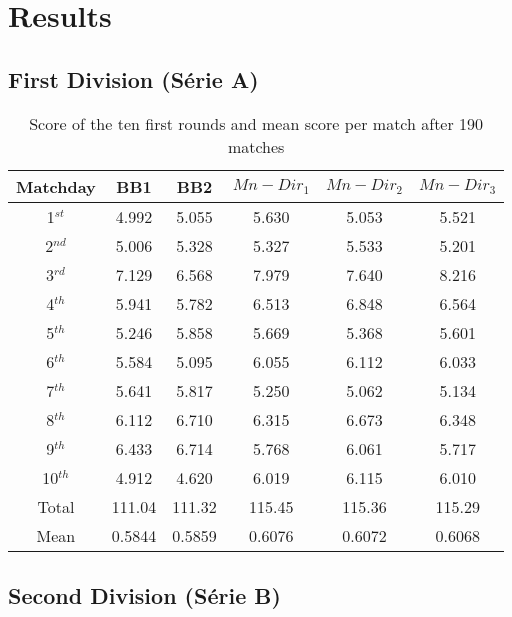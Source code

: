 \documentclass[journal,article,accept,moreauthors,pdftex,12pt,a4paper]{mdpi}
\begin{document}
\section{Results}

\subsection{First Division (S\'erie A)}

\begin{table}[h]
\begin{center}
\begin{tabular}{cccccc}

\hline
Matchday & BB1 & BB2 & $Mn-Dir_1$ & $Mn-Dir_2$ & $Mn-Dir_3$\\
\hline
\hline
1$^{st}$ &4.992 & 5.055 & 5.630 & 5.053 & 5.521 \\
2$^{nd}$ &5.006 & 5.328 & 5.327 & 5.533 & 5.201 \\
3$^{rd}$ &7.129 & 6.568 & 7.979 & 7.640 & 8.216 \\
4$^{th}$ &5.941 & 5.782 & 6.513 & 6.848 & 6.564 \\
5$^{th}$ &5.246 & 5.858 & 5.669 & 5.368 & 5.601 \\
6$^{th}$ &5.584 & 5.095 & 6.055 & 6.112 & 6.033 \\
7$^{th}$ &5.641 & 5.817 & 5.250 & 5.062 & 5.134 \\
8$^{th}$ &6.112 & 6.710 & 6.315 & 6.673 & 6.348 \\
9$^{th}$ &6.433 & 6.714 & 5.768 & 6.061 & 5.717 \\
10$^{th}$ &4.912 & 4.620 & 6.019 & 6.115 & 6.010 \\
\hline
Total & 111.04 & 111.32 & 115.45 & 115.36 & 115.29 \\
\hline
Mean & 0.5844 & 0.5859 & 0.6076 & 0.6072 & 0.6068 \\
\hline
\end{tabular}
\caption{Score of the ten first rounds and mean score per match after 190 matches}
\end{center}
\end{table}


\subsection{Second Division (S\'erie B)}
\end{document}
